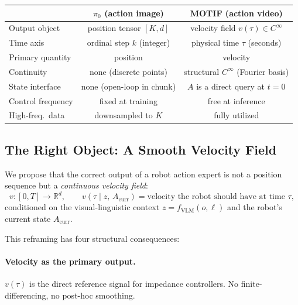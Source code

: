 \documentclass[11pt]{article}
\theoremstyle{plain}
\theoremstyle{definition}
\newenvironment{insightbox}[1][Insight]{%
  \begin{tcolorbox}[enhanced,breakable,colback=orange!5!white,
    colframe=orange!60!black,fonttitle=\bfseries,title=#1,
    boxrule=0.6pt,arc=5pt,left=8pt,right=8pt]}
  {\end{tcolorbox}}
\newcommand{\R}{\mathbb{R}}
\newcommand{\tdiff}{t}
\newcommand{\texec}{\tau}
\newcommand{\bz}{z}
\begin{document}
\begin{insightbox}[The Core Distinction]
\centering
\setlength{\tabcolsep}{5pt}
\begin{tabular}{lcc}
\toprule
& \textbf{$\pi_0$ (action image)} & \textbf{MOTIF (action video)} \\
\midrule
Output object       & position tensor $[K, d]$        & velocity field $v(\texec) \in C^\infty$ \\
Time axis           & ordinal step $k$ (integer)       & physical time $\texec$ (seconds) \\
Primary quantity    & position                          & velocity \\
Continuity          & none (discrete points)            & structural $C^\infty$ (Fourier basis) \\
State interface     & none (open-loop in chunk)         & $A$ is a direct query at $\tdiff=0$ \\
Control frequency   & fixed at training                 & free at inference \\
High-freq.\ data    & downsampled to $K$                & fully utilized \\
\bottomrule
\end{tabular}
\end{insightbox}

\subsection{The Right Object: A Smooth Velocity Field}

We propose that the correct output of a robot action expert is not a
position sequence but a \emph{continuous velocity field}:
\begin{equation}
  \label{eq:vfield}
  v : [0,T] \to \R^d, \qquad v(\texec \mid \bz,\, A_{\mathrm{curr}})
  = \text{velocity the robot should have at time } \texec,
\end{equation}
conditioned on the visual-linguistic context $\bz = f_{\mathrm{VLM}}(o,\ell)$
and the robot's current state $A_{\mathrm{curr}}$.

This reframing has four structural consequences:

\paragraph{Velocity as the primary output.}
$v(\texec)$ is the direct reference signal for impedance controllers.
No finite-differencing, no post-hoc smoothing.
\end{document}
